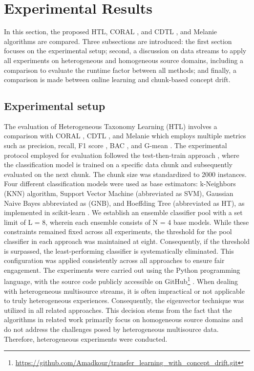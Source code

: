 
\section{Experimental Results}
\label{sec:6_Expsetup}

In this section, the proposed HTL, CORAL \cite{sun2016return}, and CDTL \cite{yang2021concept}, and Melanie \cite{dong2019multistream} algorithms are compared. Three subsections are introduced: the first section focuses on the experimental setup; second, a discussion on data streams to apply all experiments on heterogeneous and homogeneous source domains, including a comparison to evaluate the runtime factor between all methods; and finally, a comparison is made between online learning and chunk-based concept drift.
\subsection{Experimental setup}
The evaluation of Heterogeneous Taxonomy Learning (HTL) involves a comparison with CORAL \cite{sun2016return}, CDTL \cite{yang2021concept}, and Melanie \cite{dong2019multistream}  which employs multiple metrics such as precision, recall, F1 score \cite{sasaki2007truth}, BAC \cite{brodersen2010balanced}, and G-mean \cite{kubat1997addressing}. The experimental protocol employed for evaluation followed the test-then-train approach \cite{krawczyk2017ensemble}, where the classification model is trained on a specific data chunk and subsequently evaluated on the next chunk. The chunk size was standardized to 2000 instances. Four different classification models were used as base estimators: k-Neighbors (KNN) algorithm, Support Vector Machine (abbreviated as SVM), Gaussian Naive Bayes abbreviated as (GNB), and Hoeffding Tree (abbreviated as HT), as implemented in scikit-learn \cite{frias2014online}. We establish an ensemble classifier pool with a set limit of L = 8, wherein each ensemble consists of N = 4 base models. While these constraints remained fixed across all experiments, the threshold for the pool classifier in each approach was maintained at eight. Consequently, if the threshold is surpassed, the least-performing classifier is systematically eliminated. This configuration was applied consistently across all approaches to ensure fair engagement. The experiments were carried out using the Python programming language, with the source code publicly accessible on GitHub\footnote{\url{https://github.com/Amadkour/transfer_learning_with_concept_drift.git}} . When dealing with heterogeneous multisource streams, it is often impractical or not applicable to truly heterogeneous experiences. Consequently, the eigenvector technique was utilized in all related approaches. This decision stems from the fact that the algorithms in related work primarily focus on homogeneous source domains and do not address the challenges posed by heterogeneous multisource data. Therefore, heterogeneous experiments were conducted.

